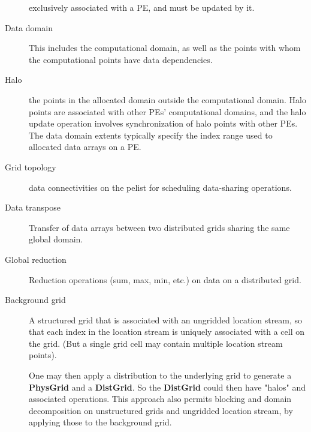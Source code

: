 \begin{description}
  exclusively associated with a PE, and must be updated by it.
\item[Data domain] This includes the computational domain, as well as
  the points with whom the computational points have data
  dependencies.
\item[Halo] the points in the allocated domain outside the
  computational domain. Halo points are associated with other PEs'
  computational domains, and the halo update operation involves
  synchronization of halo points with other PEs. The data domain
  extents typically specify the index range used to allocated data
  arrays on a PE.
\item[Grid topology] data connectivities on the pelist for scheduling
  data-sharing operations.
\item[Data transpose] Transfer of data arrays between two distributed
  grids sharing the same global domain.
\item[Global reduction] Reduction operations (sum, max, min, etc.) on
  data on a distributed grid.
\item[Background grid] A structured grid that is associated with an
  ungridded location stream, so that each index in the location stream
  is uniquely associated with a cell on the grid. (But a single grid
  cell may contain multiple location stream points).
  
  One may then apply a distribution to the underlying grid to generate
  a \textbf{PhysGrid} and a \textbf{DistGrid}. So the \textbf{DistGrid}
  could then have "halos" and associated operations. This approach
  also permits blocking and domain decomposition on unstructured grids
  and ungridded location stream, by applying those to the background
  grid.



\end{description}




